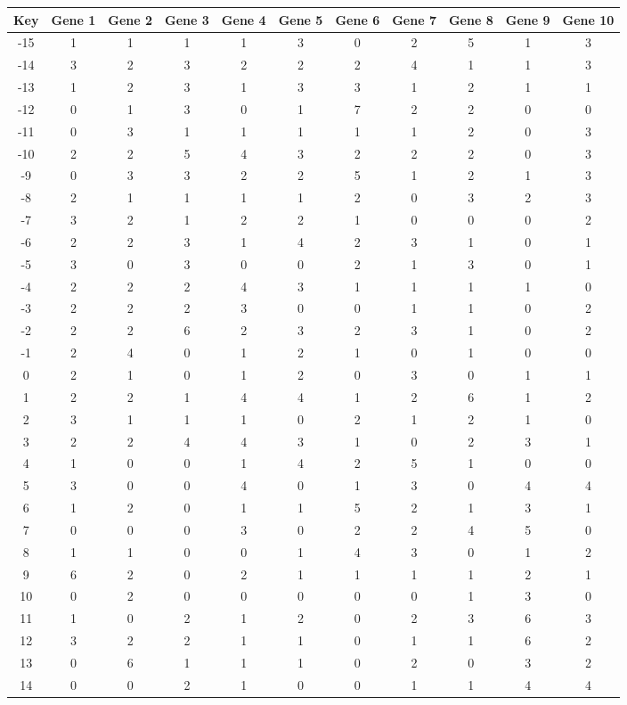 \begin{tabular}{|c|c|c|c|c|c|c|c|c|c|c|}
\hline
Key & Gene 1 & Gene 2 & Gene 3 & Gene 4 & Gene 5 & Gene 6 & Gene 7 & Gene 8 & Gene 9 & Gene 10 \\
\hline
-15 & 1 & 1 & 1 & 1 & 3 & 0 & 2 & 5 & 1 & 3 \\
-14 & 3 & 2 & 3 & 2 & 2 & 2 & 4 & 1 & 1 & 3 \\
-13 & 1 & 2 & 3 & 1 & 3 & 3 & 1 & 2 & 1 & 1 \\
-12 & 0 & 1 & 3 & 0 & 1 & 7 & 2 & 2 & 0 & 0 \\
-11 & 0 & 3 & 1 & 1 & 1 & 1 & 1 & 2 & 0 & 3 \\
-10 & 2 & 2 & 5 & 4 & 3 & 2 & 2 & 2 & 0 & 3 \\
-9 & 0 & 3 & 3 & 2 & 2 & 5 & 1 & 2 & 1 & 3 \\
-8 & 2 & 1 & 1 & 1 & 1 & 2 & 0 & 3 & 2 & 3 \\
-7 & 3 & 2 & 1 & 2 & 2 & 1 & 0 & 0 & 0 & 2 \\
-6 & 2 & 2 & 3 & 1 & 4 & 2 & 3 & 1 & 0 & 1 \\
-5 & 3 & 0 & 3 & 0 & 0 & 2 & 1 & 3 & 0 & 1 \\
-4 & 2 & 2 & 2 & 4 & 3 & 1 & 1 & 1 & 1 & 0 \\
-3 & 2 & 2 & 2 & 3 & 0 & 0 & 1 & 1 & 0 & 2 \\
-2 & 2 & 2 & 6 & 2 & 3 & 2 & 3 & 1 & 0 & 2 \\
-1 & 2 & 4 & 0 & 1 & 2 & 1 & 0 & 1 & 0 & 0 \\
0 & 2 & 1 & 0 & 1 & 2 & 0 & 3 & 0 & 1 & 1 \\
1 & 2 & 2 & 1 & 4 & 4 & 1 & 2 & 6 & 1 & 2 \\
2 & 3 & 1 & 1 & 1 & 0 & 2 & 1 & 2 & 1 & 0 \\
3 & 2 & 2 & 4 & 4 & 3 & 1 & 0 & 2 & 3 & 1 \\
4 & 1 & 0 & 0 & 1 & 4 & 2 & 5 & 1 & 0 & 0 \\
5 & 3 & 0 & 0 & 4 & 0 & 1 & 3 & 0 & 4 & 4 \\
6 & 1 & 2 & 0 & 1 & 1 & 5 & 2 & 1 & 3 & 1 \\
7 & 0 & 0 & 0 & 3 & 0 & 2 & 2 & 4 & 5 & 0 \\
8 & 1 & 1 & 0 & 0 & 1 & 4 & 3 & 0 & 1 & 2 \\
9 & 6 & 2 & 0 & 2 & 1 & 1 & 1 & 1 & 2 & 1 \\
10 & 0 & 2 & 0 & 0 & 0 & 0 & 0 & 1 & 3 & 0 \\
11 & 1 & 0 & 2 & 1 & 2 & 0 & 2 & 3 & 6 & 3 \\
12 & 3 & 2 & 2 & 1 & 1 & 0 & 1 & 1 & 6 & 2 \\
13 & 0 & 6 & 1 & 1 & 1 & 0 & 2 & 0 & 3 & 2 \\
14 & 0 & 0 & 2 & 1 & 0 & 0 & 1 & 1 & 4 & 4 \\
\hline
\end{tabular}